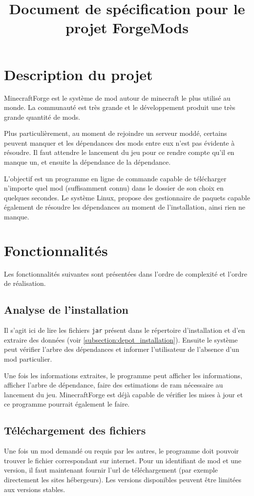 \documentclass{article}
\title{Document de spécification pour le projet ForgeMods}
\begin{document}
\maketitle
\tableofcontents

\section{Description du projet}
MinecraftForge est le système de mod autour de minecraft le plus utilisé au monde.
La communauté est très grande et le développement produit une très grande quantité de mods.

Plus particulièrement, au moment de rejoindre un serveur moddé, certains peuvent manquer et les dépendances des mods entre eux n'est pas évidente à résoudre.
Il faut attendre le lancement du jeu pour ce rendre compte qu'il en manque un, et ensuite la dépendance de la dépendance.

L'objectif est un programme en ligne de commande capable de télécharger n'importe quel mod (suffisamment connu) dans le dossier de son choix en quelques secondes.
Le système Linux, propose des gestionnaire de paquets capable également de résoudre les dépendances au moment de l'installation, ainsi rien ne manque.


\section{Fonctionnalités}
Les fonctionnalités suivantes sont présentées dans l'ordre de complexité et l'ordre de réalisation.

\subsection{Analyse de l'installation}
Il s'agit ici de lire les fichiers \texttt{jar} présent dans le répertoire d'installation et d'en extraire des données (voir \ref{subsection:depot_installation}).
Ensuite le système peut vérifier l'arbre des dépendances et informer l'utilisateur de l'absence d'un mod particulier.

Une fois les informations extraites, le programme peut afficher les informations, afficher l'arbre de dépendance, faire des estimations de ram nécessaire au lancement du jeu.
MinecraftForge est déjà capable de vérifier les mises à jour et ce programme pourrait également le faire.


\subsection{Téléchargement des fichiers}
Une fois un mod demandé ou requis par les autres, le programme doit pouvoir trouver le fichier correspondant sur internet.
Pour un identifiant de mod et une version, il faut maintenant fournir l'url de téléchargement (par exemple directement les sites hébergeurs).
Les versions disponibles peuvent être limitées aux versions stables.
\end{document}
